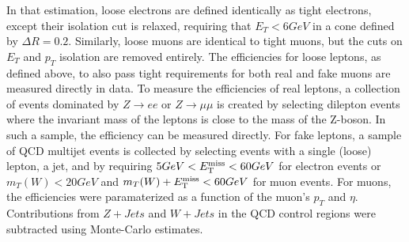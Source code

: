 In that estimation, loose electrons are defined identically as tight electrons, except their isolation cut is relaxed, requiring that $E_{T} < 6 GeV$ in a cone defined by $\Delta R = 0.2$.
Similarly, loose muons are identical to tight muons, but the cuts on $E_{T}$ and $p_{T}$ isolation are removed entirely.
The efficiencies for loose leptons, as defined above, to also pass tight requirements for both real and fake muons are measured directly in data.
To measure the efficiencies of real leptons, a collection of events dominated by $Z\rightarrow ee$ or $Z \rightarrow \mu\mu$ is created by selecting dilepton events where the invariant mass of the leptons is close to the mass of the Z-boson.
In such a sample, the efficiency can be measured directly.
For fake leptons, a sample of QCD multijet events is collected by selecting events with a single (loose) lepton, a jet, and by requiring $5 GeV < E_{\mathrm{T}}^{\mathrm{miss}} <  60 GeV$ for electron events or $m_{T}(W) < 20 GeV$ and $m_{T}(W) + E_{\mathrm{T}}^{\mathrm{miss}} < 60 GeV$ for muon events.
For muons, the efficiencies were paramaterized as a function of the muon's $p_{T}$ and $\eta$.
Contributions from $Z+Jets$ and $W+Jets$ in the QCD control regions were subtracted using Monte-Carlo estimates.

